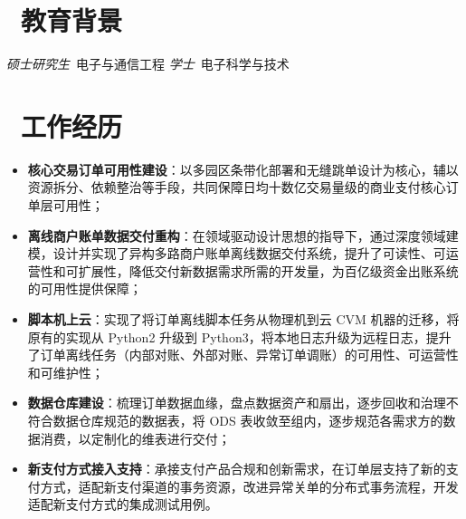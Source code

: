 \documentclass{resume}
\begin{document}


 
\section{\faGraduationCap\  教育背景}
\textit{硕士研究生}\ 电子与通信工程
\datedsubsection{\textbf{浙江大学}, 杭州}{2015 -- 2019}
\textit{学士}\ 电子科学与技术

\section{\faUsers\ 工作经历}
\begin{itemize}
  \item \textbf{核心交易订单可用性建设}：以多园区条带化部署和无缝跳单设计为核心，辅以资源拆分、依赖整治等手段，共同保障日均十数亿交易量级的商业支付核心订单层可用性；
  \item \textbf{离线商户账单数据交付重构}：在领域驱动设计思想的指导下，通过深度领域建模，设计并实现了异构多路商户账单离线数据交付系统，提升了可读性、可运营性和可扩展性，降低交付新数据需求所需的开发量，为百亿级资金出账系统的可用性提供保障；
  \item \textbf{脚本机上云}：实现了将订单离线脚本任务从物理机到云 CVM 机器的迁移，将原有的实现从 Python2 升级到 Python3，将本地日志升级为远程日志，提升了订单离线任务（内部对账、外部对账、异常订单调账）的可用性、可运营性和可维护性；
  \item \textbf{数据仓库建设}：梳理订单数据血缘，盘点数据资产和扇出，逐步回收和治理不符合数据仓库规范的数据表，将 ODS 表收敛至组内，逐步规范各需求方的数据消费，以定制化的维表进行交付；
  \item \textbf{新支付方式接入支持}：承接支付产品合规和创新需求，在订单层支持了新的支付方式，适配新支付渠道的事务资源，改进异常关单的分布式事务流程，开发适配新支付方式的集成测试用例。
\end{itemize}
\end{document}
